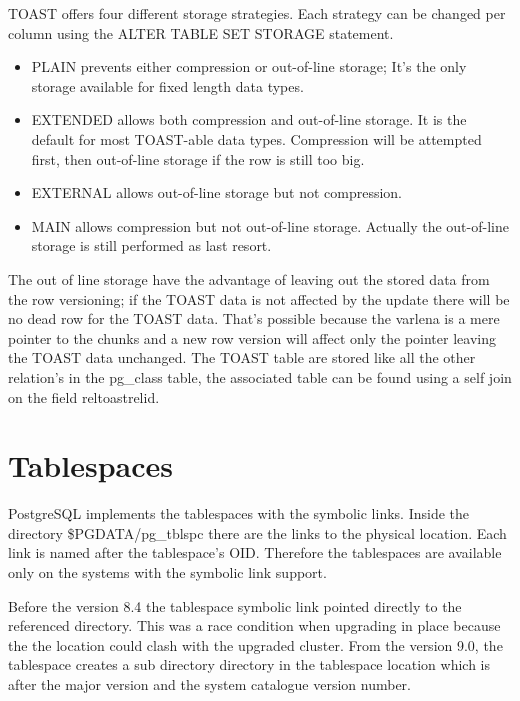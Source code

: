 TOAST offers four different storage strategies. Each strategy can be changed per column using the  ALTER
TABLE SET STORAGE statement.
\begin{itemize}

\item  PLAIN prevents either compression or out-of-line storage; It's the only storage available
for fixed length data types.

\item  EXTENDED allows both compression and out-of-line storage. It is the default for most
TOAST-able data types. Compression will be attempted first, then out-of-line storage if the row is
still too big.

\item  EXTERNAL allows out-of-line storage but not compression.

\item  MAIN allows compression but not out-of-line storage. Actually the out-of-line storage is
still performed as last resort.

\end{itemize}

The out of line storage have the advantage of leaving out the
stored data from the row versioning; if the TOAST data is not affected by the update there will be
no dead row for the TOAST data. That's possible because the varlena is a mere pointer to the chunks
and a new row version will affect only the pointer leaving the TOAST data unchanged.\newline
The TOAST table are stored like all the other relation's in the pg\_class table, the associated
table can be found using a self join on the field reltoastrelid.\newline


\section{Tablespaces}
\label{sub:TBS-PHYSICAL}
PostgreSQL implements the tablespaces with the symbolic links. Inside the directory \$PGDATA/pg\_tblspc
there are the links to the physical location. Each link is named after the tablespace's OID. Therefore the
tablespaces are available only on the systems with the symbolic link support.\newline

Before the version 8.4 the tablespace symbolic link pointed directly to the referenced directory. This was
a race condition when upgrading in place because the the location could clash with the upgraded cluster.
From the version 9.0, the tablespace creates a sub directory directory in the tablespace location which
is after the major version and the system catalogue version number.
\newline

